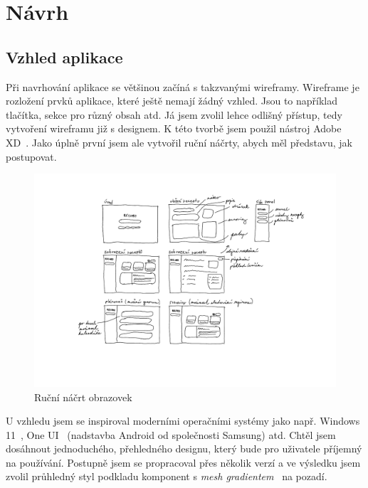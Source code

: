 
\chapter{Návrh}

\section{Vzhled aplikace}

Při navrhování aplikace se většinou začíná s takzvanými wireframy. Wireframe je rozložení prvků aplikace, které ještě
nemají žádný vzhled. Jsou to například tlačítka, sekce pro různý obsah atd. Já jsem zvolil lehce odlišný přístup, tedy
vytvoření wireframu již s designem. K této tvorbě jsem použil nástroj Adobe XD~\cite{AdobeXD}. Jako úplně první jsem ale vytvořil
ruční náčrty, abych měl představu, jak postupovat.

\begin{figure}[H]
    \includegraphics[width=\textwidth]{pdf/navrh-rucni}
    \caption{Ruční náčrt obrazovek} \label{picture:recipeo:hand-drawn-design}
\end{figure}

U vzhledu jsem se inspiroval moderními operačními systémy jako např. Windows 11~\cite{Windows11}, One UI~\cite{OneUI}
(nadstavba Android od společnosti Samsung) atd.
Chtěl jsem dosáhnout jednoduchého, přehledného designu, který bude pro uživatele příjemný na používání. Postupně jsem se
propracoval přes několik verzí a ve výsledku jsem zvolil průhledný styl podkladu komponent s \emph{mesh gradientem}~\cite{MeshGradients} na pozadí.

